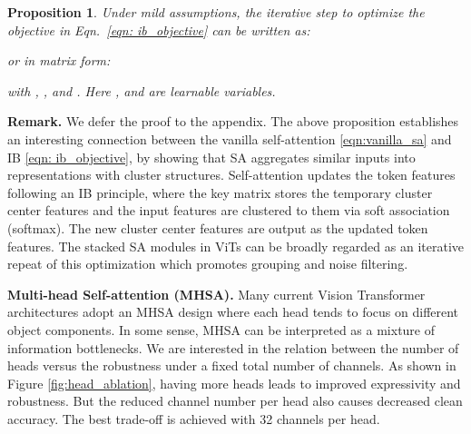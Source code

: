 \documentclass[nohyperref]{article}
\theoremstyle{plain}
\newtheorem{proposition}[theorem]{Proposition}
\theoremstyle{definition}
\theoremstyle{remark}
\begin{document}
\begin{proposition}
\label{prop:ib_sa}
Under mild assumptions, the iterative step to optimize the objective in Eqn.~\eqref{eqn: ib_objective} can be written as:

\vspace{-0.2cm}
\begin{small}

\end{small}

\vspace{-0.3cm}
or in matrix form:

\vspace{-0.2cm}
\begin{small}

\end{small}

\vspace{-0.3cm}
with , ,  and . Here ,  and  are  learnable variables. 
\end{proposition}

\textbf{Remark.} We defer the proof to the appendix. The above proposition establishes an interesting connection between the vanilla self-attention \eqref{eqn:vanilla_sa} and IB \eqref{eqn: ib_objective}, by showing that SA aggregates similar inputs  into representations  with cluster structures. Self-attention updates the token features following an IB principle, where the key matrix  stores the temporary cluster center features   and the input features  are clustered to them via soft association (softmax). The new cluster center features  are output as the updated token features. The stacked SA modules in ViTs can be broadly regarded as an iterative repeat of this optimization which promotes grouping and noise filtering.

\textbf{Multi-head Self-attention (MHSA).} Many current Vision Transformer architectures adopt an MHSA design where each head tends to focus on different object components. In some sense, MHSA can be interpreted as a mixture of information bottlenecks. We are interested in the relation between the number of heads versus the robustness under a fixed total number of channels. As shown in Figure \ref{fig:head_ablation}, having more heads leads to improved expressivity and robustness. But the reduced channel number per head also causes decreased clean accuracy. The best trade-off is achieved with 32 channels per head.
\end{document}
